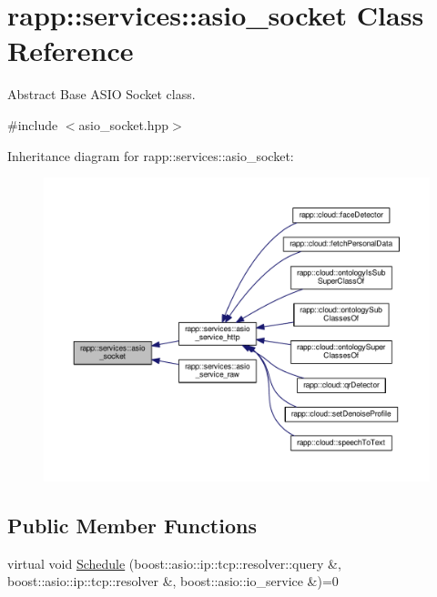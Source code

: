 \hypertarget{classrapp_1_1services_1_1asio__socket}{\section{rapp\-:\-:services\-:\-:asio\-\_\-socket Class Reference}
\label{classrapp_1_1services_1_1asio__socket}
}


Abstract Base A\-S\-I\-O Socket class.  




{\ttfamily \#include $<$asio\-\_\-socket.\-hpp$>$}



Inheritance diagram for rapp\-:\-:services\-:\-:asio\-\_\-socket\-:
\nopagebreak
\begin{figure}[H]
\begin{center}
\leavevmode
\includegraphics[width=350pt]{classrapp_1_1services_1_1asio__socket__inherit__graph}
\end{center}
\end{figure}
\subsection*{Public Member Functions}
\begin{DoxyCompactItemize}
\item 
virtual void \hyperlink{classrapp_1_1services_1_1asio__socket_a1241f0694fea6c2f13c361ddef13360b}{Schedule} (boost\-::asio\-::ip\-::tcp\-::resolver\-::query \&, boost\-::asio\-::ip\-::tcp\-::resolver \&, boost\-::asio\-::io\-\_\-service \&)=0
\end{DoxyCompactItemize}


